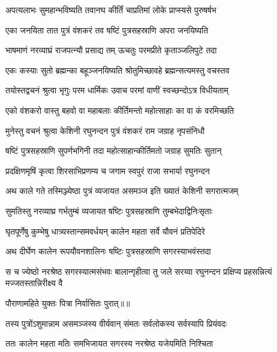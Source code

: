 \twolineshloka
{अपत्यलाभः सुमहान्भविष्यति तवानघ}
{कीर्तिं चाप्रतिमां लोके प्राप्स्यसे पुरुषर्षभ} %

\twolineshloka
{एका जनयिता तात पुत्रं वंशकरं तव}
{षष्टिं पुत्रसहस्राणि अपरा जनयिष्यति} %

\twolineshloka
{भाषमाणं नरव्याघ्रं राजपत्न्यौ प्रसाद्य तम्}
{ऊचतुः परमप्रीते कृताञ्जलिपुटे तदा} %

\twolineshloka
{एकः कस्याः सुतो ब्रह्मन्का बहूञ्जनयिष्यति}
{श्रोतुमिच्छावहे ब्रह्मन्सत्यमस्तु वचस्तव} %

\twolineshloka
{तयोस्तद्वचनं श्रुत्वा भृगुः परम धार्मिकः}
{उवाच परमां वाणीं स्वच्छन्दोऽत्र विधीयताम्} %

\twolineshloka
{एको वंशकरो वास्तु बहवो वा महाबलाः}
{कीर्तिमन्तो महोत्साहाः का वा कं वरमिच्छति} %

\twolineshloka
{मुनेस्तु वचनं श्रुत्वा केशिनी रघुनन्दन}
{पुत्रं वंशकरं राम जग्राह नृपसंनिधौ} %

\twolineshloka
{षष्टिं पुत्रसहस्राणि सुपर्णभगिनी तदा}
{महोत्साहान्कीर्तिमतो जग्राह सुमतिः सुतान्} %

\twolineshloka
{प्रदक्षिणमृषिं कृत्वा शिरसाभिप्रणम्य च}
{जगाम स्वपुरं राजा सभार्या रघुनन्दन} %

\twolineshloka
{अथ काले गते तस्मिञ्ज्येष्ठा पुत्रं व्यजायत}
{असमञ्ज इति ख्यातं केशिनी सगरात्मजम्} %

\twolineshloka
{सुमतिस्तु नरव्याघ्र गर्भतुम्बं व्यजायत}
{षष्टिः पुत्रसहस्राणि तुम्बभेदाद्विनिःसृताः} %

\twolineshloka
{घृतपूर्णेषु कुम्भेषु धात्र्यस्तान्समवर्धयन्}
{कालेन महता सर्वे यौवनं प्रतिपेदिरे} %

\twolineshloka
{अथ दीर्घेण कालेन रूपयौवनशालिनः}
{षष्टिः पुत्रसहस्राणि सगरस्याभवंस्तदा} %

\threelineshloka
{स च ज्येष्ठो नरश्रेष्ठ सगरस्यात्मसंभवः}
{बालान्गृहीत्वा तु जले सरय्वा रघुनन्दन}
{प्रक्षिप्य प्रहसन्नित्यं मज्जतस्तान्निरीक्ष्य वै} %

{पौराणामहिते युक्तः पित्रा निर्वासितः पुरात्॥॥} %

\addtocounter{shlokacount}{1}

\twolineshloka
{तस्य पुत्रोंऽशुमान्नाम असमञ्जस्य वीर्यवान्}
{संमतः सर्वलोकस्य सर्वस्यापि प्रियंवदः} %

\twolineshloka
{ततः कालेन महता मतिः समभिजायत}
{सगरस्य नरश्रेष्ठ यजेयमिति निश्चिता} %

